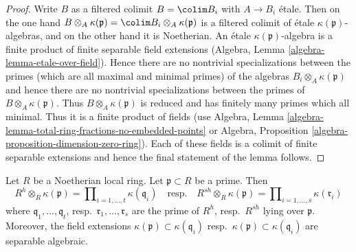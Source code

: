 \begin{proof}
Write $B$ as a filtered colimit $B = \colim B_i$ with $A \to B_i$ \'etale.
Then on the one hand
$B \otimes_A \kappa(\mathfrak p) = \colim B_i \otimes_A \kappa(\mathfrak p)$
is a filtered colimit of \'etale $\kappa(\mathfrak p)$-algebras, and
on the other hand it is Noetherian. An \'etale
$\kappa(\mathfrak p)$-algebra is a finite product of finite separable field
extensions (Algebra, Lemma \ref{algebra-lemma-etale-over-field}).
Hence there are no nontrivial specializations between the primes
(which are all maximal and minimal primes) of the algebras
$B_i \otimes_A \kappa(\mathfrak p)$ and hence there are no
nontrivial specializations between the primes of
$B \otimes_A \kappa(\mathfrak p)$. Thus
$B \otimes_A \kappa(\mathfrak p)$ is reduced and
has finitely many primes which all minimal.
Thus it is a finite product of fields (use
Algebra, Lemma \ref{algebra-lemma-total-ring-fractions-no-embedded-points}
or
Algebra, Proposition \ref{algebra-proposition-dimension-zero-ring}).
Each of these fields is a colimit of finite separable extensions
and hence the final statement of the lemma follows.
\end{proof}

\begin{lemma}
\label{lemma-fibres-henselization}
Let $R$ be a Noetherian local ring. Let $\mathfrak p \subset R$ be a prime.
Then
$$
R^h \otimes_R \kappa(\mathfrak p) =
\prod\nolimits_{i = 1, \ldots, t} \kappa(\mathfrak q_i)
\quad\text{resp.}\quad
R^{sh} \otimes_R \kappa(\mathfrak p) =
\prod\nolimits_{i = 1, \ldots, s} \kappa(\mathfrak r_i)
$$
where $\mathfrak q_1, \ldots, \mathfrak q_t$,
resp.\ $\mathfrak r_1, \ldots, \mathfrak r_s$
are the prime of $R^h$, resp.\ $R^{sh}$ lying over $\mathfrak p$.
Moreover, the field extensions
$\kappa(\mathfrak p) \subset \kappa(\mathfrak q_i)$
resp.\ $\kappa(\mathfrak p) \subset \kappa(\mathfrak q_i)$
are separable algebraic.
\end{lemma}

